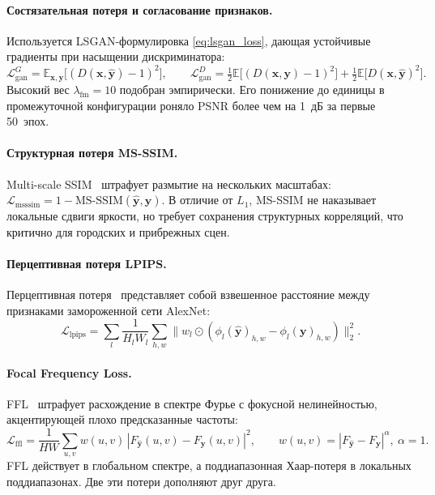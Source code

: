 \paragraph{Состязательная потеря и согласование признаков.}
Используется LSGAN-формулировка \ref{eq:lsgan_loss}, дающая устойчивые градиенты при насыщении
дискриминатора:
\begin{equation}
  \mathcal{L}_{\text{gan}}^{G} = \mathbb{E}_{\mathbf{x},\mathbf{y}}
     \bigl[(D(\mathbf{x},\hat{\mathbf{y}})-1)^{2}\bigr],\qquad
  \mathcal{L}_{\text{gan}}^{D}
   = \tfrac{1}{2}\mathbb{E}\bigl[(D(\mathbf{x},\mathbf{y})-1)^{2}\bigr]
   + \tfrac{1}{2}\mathbb{E}\bigl[D(\mathbf{x},\hat{\mathbf{y}})^{2}\bigr].
\end{equation}
Высокий вес $\lambda_{\text{fm}}=10$ подобран эмпирически. Его понижение до единицы
в промежуточной конфигурации роняло PSNR более чем на 1~дБ за первые
50~эпох.

\paragraph{Структурная потеря MS-SSIM.}
Multi-scale SSIM~\cite{wang2003msssim} штрафует размытие на нескольких масштабах:
$\mathcal{L}_{\text{msssim}} = 1 - \mathrm{MS\text{-}SSIM}(\hat{\mathbf{y}},\mathbf{y})$.
В отличие от $L_{1}$, MS-SSIM не наказывает локальные сдвиги яркости, но требует
сохранения структурных корреляций, что критично для городских и прибрежных сцен.

\paragraph{Перцептивная потеря LPIPS.}
Перцептивная потеря~\cite{zhang2018unreasonable} представляет собой взвешенное расстояние между
признаками замороженной сети AlexNet:
\begin{equation}
  \mathcal{L}_{\text{lpips}}=\sum_{l}\frac{1}{H_{l}W_{l}}
     \sum_{h,w}\bigl\|w_{l}\odot
     (\phi_{l}(\hat{\mathbf{y}})_{h,w}-\phi_{l}(\mathbf{y})_{h,w})\bigr\|_{2}^{2}.
\end{equation}

\paragraph{Focal Frequency Loss.}
FFL~\cite{jiang2021ffl} штрафует расхождение в спектре Фурье с фокусной
нелинейностью, акцентирующей плохо предсказанные частоты:
\begin{equation}
  \mathcal{L}_{\text{ffl}}=\frac{1}{HW}\sum_{u,v}
    w(u,v)\,|F_{\hat{\mathbf{y}}}(u,v)-F_{\mathbf{y}}(u,v)|^{2},\qquad
  w(u,v)=|F_{\hat{\mathbf{y}}}-F_{\mathbf{y}}|^{\alpha},\ \alpha=1.
\end{equation}
FFL действует в глобальном спектре, а поддиапазонная Хаар-потеря в
локальных поддиапазонах. Две эти потери дополняют друг друга.

